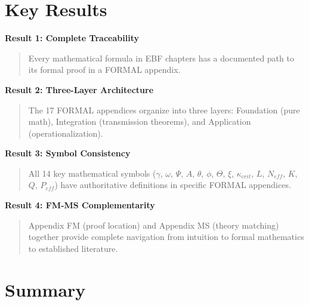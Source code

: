 \section{Key Results}
\label{sec:fm-results}

\begin{tcolorbox}[colback=green!5!white, colframe=green!75!black,
    title=\textbf{Key Results of This Appendix}]

\textbf{Result 1: Complete Traceability}
\begin{quote}
Every mathematical formula in EBF chapters has a documented path to its formal proof in a FORMAL appendix.
\end{quote}

\textbf{Result 2: Three-Layer Architecture}
\begin{quote}
The 17 FORMAL appendices organize into three layers: Foundation (pure math), Integration (transmission theorems), and Application (operationalization).
\end{quote}

\textbf{Result 3: Symbol Consistency}
\begin{quote}
All 14 key mathematical symbols ($\gamma$, $\omega$, $\Psi$, $A$, $\theta$, $\phi$, $\Theta$, $\xi$, $\kappa_{crit}$, $L$, $N_{eff}$, $K$, $Q$, $P_{eff}$) have authoritative definitions in specific FORMAL appendices.
\end{quote}

\textbf{Result 4: FM-MS Complementarity}
\begin{quote}
Appendix FM (proof location) and Appendix MS (theory matching) together provide complete navigation from intuition to formal mathematics to established literature.
\end{quote}

\end{tcolorbox}

\section{Summary}
\label{sec:fm-summary}

